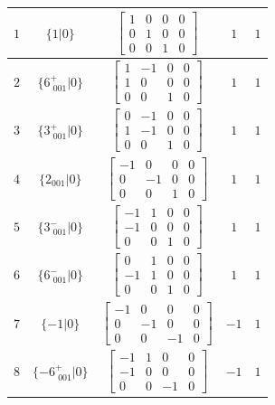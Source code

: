 \documentclass[fleqn,8pt]{jsarticle}
\begin{document}
\begin{longtable}{ccccc}
$ 1 $ & $ \{1|0\} $ & $ \begin{bmatrix} 1 & 0 & 0 & 0 \\ 0 & 1 & 0 & 0 \\ 0 & 0 & 1 & 0 \end{bmatrix} $ & $ 1 $ & $ 1 $ \\ \hline
$ 2 $ & $ \{6^{+}_{\,\,001}|0\} $ & $ \begin{bmatrix} 1 & -1 & 0 & 0 \\ 1 & 0 & 0 & 0 \\ 0 & 0 & 1 & 0 \end{bmatrix} $ & $ 1 $ & $ 1 $ \\ \hline
$ 3 $ & $ \{3^{+}_{\,\,001}|0\} $ & $ \begin{bmatrix} 0 & -1 & 0 & 0 \\ 1 & -1 & 0 & 0 \\ 0 & 0 & 1 & 0 \end{bmatrix} $ & $ 1 $ & $ 1 $ \\ \hline
$ 4 $ & $ \{2{}_{001}|0\} $ & $ \begin{bmatrix} -1 & 0 & 0 & 0 \\ 0 & -1 & 0 & 0 \\ 0 & 0 & 1 & 0 \end{bmatrix} $ & $ 1 $ & $ 1 $ \\ \hline
$ 5 $ & $ \{3^{-}_{\,\,001}|0\} $ & $ \begin{bmatrix} -1 & 1 & 0 & 0 \\ -1 & 0 & 0 & 0 \\ 0 & 0 & 1 & 0 \end{bmatrix} $ & $ 1 $ & $ 1 $ \\ \hline
$ 6 $ & $ \{6^{-}_{\,\,001}|0\} $ & $ \begin{bmatrix} 0 & 1 & 0 & 0 \\ -1 & 1 & 0 & 0 \\ 0 & 0 & 1 & 0 \end{bmatrix} $ & $ 1 $ & $ 1 $ \\ \hline
$ 7 $ & $ \{-1|0\} $ & $ \begin{bmatrix} -1 & 0 & 0 & 0 \\ 0 & -1 & 0 & 0 \\ 0 & 0 & -1 & 0 \end{bmatrix} $ & $ -1 $ & $ 1 $ \\ \hline
$ 8 $ & $ \{-6^{+}_{\,\,001}|0\} $ & $ \begin{bmatrix} -1 & 1 & 0 & 0 \\ -1 & 0 & 0 & 0 \\ 0 & 0 & -1 & 0 \end{bmatrix} $ & $ -1 $ & $ 1 $ \\ \hline

\end{longtable}
\end{document}
